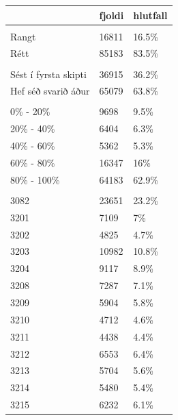 \documentclass[
  12pt,
]{article}
\begin{document}
\begin{longtable}{>{\raggedright\arraybackslash}p{4cm}ll}
\toprule
  & fjoldi & hlutfall\\
\midrule
\addlinespace[0.3em]
\multicolumn{3}{l}{\textbf{correct}}\\
\hspace{1em}Rangt & 16811 & 16.5\%\\
\hspace{1em}Rétt & 85183 & 83.5\%\\
\addlinespace[0.3em]
\multicolumn{3}{l}{\textbf{hsta}}\\
\hspace{1em}Sést í fyrsta skipti & 36915 & 36.2\%\\
\hspace{1em}Hef séð svarið áður & 65079 & 63.8\%\\
\addlinespace[0.3em]
\multicolumn{3}{l}{\textbf{hluta2}}\\
\hspace{1em}0\% - 20\% & 9698 & 9.5\%\\
\hspace{1em}20\% - 40\% & 6404 & 6.3\%\\
\hspace{1em}40\% - 60\% & 5362 & 5.3\%\\
\hspace{1em}60\% - 80\% & 16347 & 16\%\\
\hspace{1em}80\% - 100\% & 64183 & 62.9\%\\
\addlinespace[0.3em]
\multicolumn{3}{l}{\textbf{lectureId}}\\
\hspace{1em}3082 & 23651 & 23.2\%\\
\hspace{1em}3201 & 7109 & 7\%\\
\hspace{1em}3202 & 4825 & 4.7\%\\
\hspace{1em}3203 & 10982 & 10.8\%\\
\hspace{1em}3204 & 9117 & 8.9\%\\
\hspace{1em}3208 & 7287 & 7.1\%\\
\hspace{1em}3209 & 5904 & 5.8\%\\
\hspace{1em}3210 & 4712 & 4.6\%\\
\hspace{1em}3211 & 4438 & 4.4\%\\
\hspace{1em}3212 & 6553 & 6.4\%\\
\hspace{1em}3213 & 5704 & 5.6\%\\
\hspace{1em}3214 & 5480 & 5.4\%\\
\hspace{1em}3215 & 6232 & 6.1\%\\
\bottomrule
\end{longtable}
\end{document}
